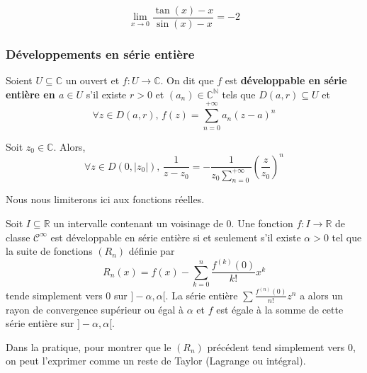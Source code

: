   \begin{application}
    \[ \lim_{x \rightarrow 0} \frac{\tan(x) - x}{\sin(x) - x} = -2 \]
  \end{application}

  \subsubsection{Développements en série entière}


  \begin{definition}
    Soient $U \subseteq \mathbb{C}$ un ouvert et $f : U \rightarrow \mathbb{C}$. On dit que $f$ est \textbf{développable en série entière en $a \in U$} s'il existe $r > 0$ et $(a_n) \in \mathbb{C}^{\mathbb{N}}$ tels que $D(a, r) \subseteq U$ et
    \[ \forall z \in D(a, r), \, f(z) = \sum_{n=0}^{+\infty} a_n (z-a)^n \]
  \end{definition}


  \begin{example}
    Soit $z_0 \in \mathbb{C}$. Alors,
    \[ \forall z \in D(0,\vert z_0 \vert), \, \frac{1}{z-z_0} = -\frac{1}{z_0 \sum_{n=0}^{+\infty}} \left( \frac{z}{z_0} \right)^n \]
  \end{example}

  Nous nous limiterons ici aux fonctions réelles.

  \begin{proposition}
    Soit $I \subseteq \mathbb{R}$ un intervalle contenant un voisinage de $0$. Une fonction $f : I \rightarrow \mathbb{R}$ de classe $\mathcal{C}^\infty$ est développable en série entière si et seulement s'il existe $\alpha > 0$ tel que la suite de fonctions $(R_n)$ définie par
    \[ R_n(x) = f(x) - \sum_{k=0}^{n} \frac{f^{(k)}(0)}{k!} x^k \]
    tende simplement vers $0$ sur $]-\alpha, \alpha[$. La série entière $\sum \frac{f^{(n)}(0)}{n!} z^n$ a alors un rayon de convergence supérieur ou égal à $\alpha$ et $f$ est égale à la somme de cette série entière sur $]-\alpha,\alpha[$.
  \end{proposition}

  \begin{remark}
    Dans la pratique, pour montrer que le $(R_n)$ précédent tend simplement vers $0$, on peut l'exprimer comme un reste de Taylor (Lagrange ou intégral).
  \end{remark}


